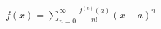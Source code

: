 \documentclass[preview]{standalone}
\begin{document}
\begin{align*}
f(x) = \sum_{n=0}^{\infty} \frac{f^{(n)}(a)}{n!}(x - a)^n
\end{align*}
\end{document}
